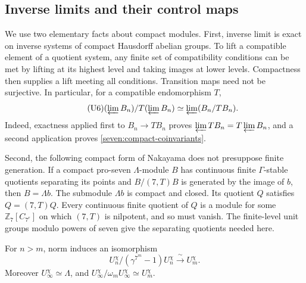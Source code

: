 \subsection{Inverse limits and their control maps}

We use two elementary facts about compact modules. First, inverse
limit is exact on inverse systems of compact Hausdorff abelian groups.
To lift a compatible element of a quotient system, any finite set of
compatibility conditions can be met by lifting at its highest level
and taking images at lower levels. Compactness then supplies a lift
meeting all conditions. Transition maps need not be surjective.
In particular, for a compatible endomorphism $T$,
\begin{equation*}\tag{U6}\label{seven:compact-coinvariants}
 (\varprojlim B_n)/T(\varprojlim B_n)
 \simeq\varprojlim(B_n/TB_n).
\end{equation*}
Indeed, exactness applied first to $B_n\to TB_n$ proves
$\varprojlim TB_n=T\varprojlim B_n$, and a second application proves
\eqref{seven:compact-coinvariants}.

Second, the following compact form of Nakayama does not presuppose
finite generation. If a compact pro-seven $\Lambda$-module $B$ has
continuous finite $\Gamma$-stable quotients separating its points and
$B/(7,T)B$ is generated by the image of $b$, then $B=\Lambda b$.
The submodule $\Lambda b$ is compact and closed. Its quotient $Q$
satisfies $Q=(7,T)Q$. Every continuous finite quotient of $Q$ is a
module for some $\mathbb Z_7[C_{7^r}]$ on which $(7,T)$ is nilpotent,
and so must vanish. The finite-level unit groups modulo powers of
seven give the separating quotients needed here.

\begin{lemma}\label{seven:local-unit-control}
For $n>m$, norm induces an isomorphism
\[
 U_n^\chi/(\gamma^{7^m}-1)U_n^\chi
 \xrightarrow{\ \sim\ }U_m^\chi.
\]
Moreover $U_\infty^\chi\simeq\Lambda$, and
$U_\infty^\chi/\omega_mU_\infty^\chi\simeq U_m^\chi$.
\end{lemma}

